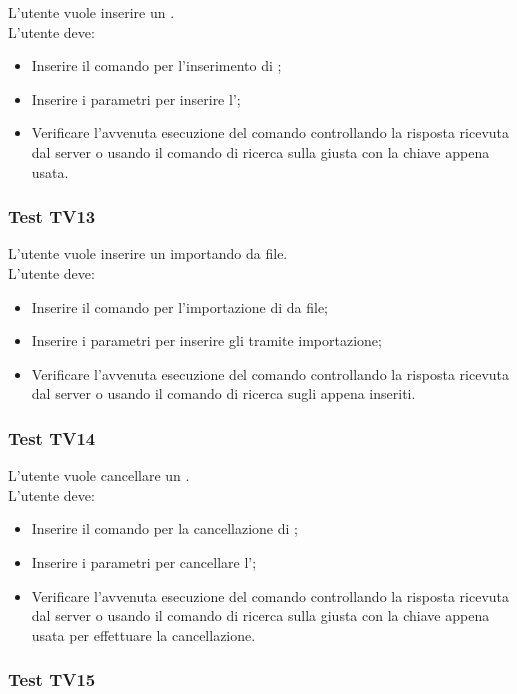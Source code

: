 \documentclass{scalatekids-article}
\begin{document}
L'utente vuole inserire un .\\
L'utente deve:
\begin{itemize}
\item Inserire il comando per l'inserimento di ;
\item Inserire i parametri per inserire l';
\item Verificare l'avvenuta esecuzione del comando controllando la risposta ricevuta dal server o usando il comando di ricerca sulla  giusta con la chiave appena usata.
\end{itemize}

\subsubsection{Test TV13}

L'utente vuole inserire un  importando da file.\\
L'utente deve:
\begin{itemize}
\item Inserire il comando per l'importazione di  da file;
\item Inserire i parametri per inserire gli  tramite importazione;
\item Verificare l'avvenuta esecuzione del comando controllando la risposta ricevuta dal server o usando il comando di ricerca sugli  appena inseriti.
\end{itemize}

\subsubsection{Test TV14}

L'utente vuole cancellare un .\\
L'utente deve:
\begin{itemize}
\item Inserire il comando per la cancellazione di ;
\item Inserire i parametri per cancellare l';
\item Verificare l'avvenuta esecuzione del comando controllando la risposta ricevuta dal server o usando il comando di ricerca sulla  giusta con la chiave appena usata per effettuare la cancellazione.
\end{itemize}

\subsubsection{Test TV15}
\end{document}
